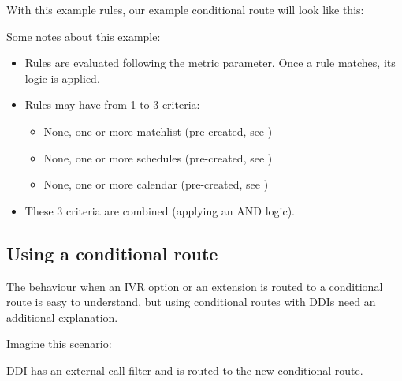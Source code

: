 \documentclass[letterpaper,10pt,english]{sphinxmanual}
\begin{document}
\noindent{}

With this example rules, our example conditional route will look like this:

\noindent{}

Some notes about this example:
\begin{itemize}
\item {} 
Rules are evaluated following the metric parameter. Once a rule matches, its
logic is applied.

\item {} 
Rules may have from 1 to 3 criteria:
\begin{itemize}
\item {} 
None, one or more matchlist (pre-created, see {\hyperref[company/match_lists:match\string-lists]{}})

\item {} 
None, one or more schedules (pre-created, see {\hyperref[company/schedules:schedules]{}})

\item {} 
None, one or more calendar (pre-created, see {\hyperref[company/calendars:calendars]{}})

\end{itemize}

\item {} 
These 3 criteria are combined (applying an AND logic).

\end{itemize}


\subsection{Using a conditional route}
\label{company/conditional_routes:using-a-conditional-route}
The behaviour when an IVR option or an extension is routed to a conditional
route is easy to understand, but using conditional routes with DDIs need an
additional explanation.

Imagine this scenario:

\noindent{}

DDI has an external call filter and is routed to the new conditional route.
\end{document}
